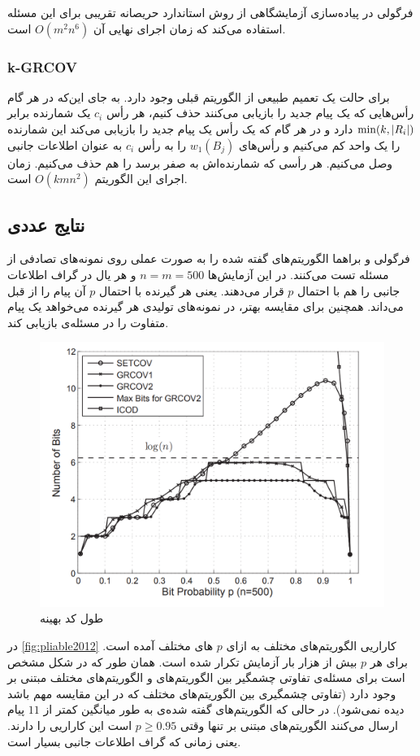 فرگولی در پیاده‌سازی آزمایشگاهی از روش استاندارد حریصانه تقریبی برای این مسئله استفاده می‌کند که زمان اجرای نهایی آن
$O(m^2 n^6)$
است.

\subsubsection{k-GRCOV}
برای حالت
\picodt
یک تعمیم طبیعی از الگوریتم قبلی وجود دارد. به جای این‌که در هر گام رأس‌هایی که یک پیام جدید را بازیابی می‌کنند حذف کنیم، هر رأس
$c_i$
یک شمارنده برابر
$\min(k, \left|{R_i}\right|)$
دارد و در هر گام که یک رأس یک پیام جدید را بازیابی می‌کند این شمارنده را یک واحد کم می‌کنیم و رأس‌های
$w_1(B_j)$
را به رأس
$c_i$
به عنوان اطلاعات جانبی وصل می‌کنیم. هر رأسی که شمارنده‌اش به صفر برسد را هم حذف می‌کنیم. زمان اجرای این الگوریتم
$O(kmn^2)$
است.

\subsection{
    نتایج عددی
}
فرگولی و براهما الگوریتم‌های گفته شده را به صورت عملی روی نمونه‌های تصادفی از مسئله تست می‌کنند. در این آزمایش‌ها
$n = m = 500$
و هر یال در گراف اطلاعات جانبی را هم با احتمال
$p$
قرار می‌دهند. یعنی هر گیرنده با احتمال
$p$
آن پیام را از قبل می‌داند. همچنین برای مقایسه بهتر، در نمونه‌های تولیدی هر گیرنده می‌خواهد یک پیام متفاوت را در مسئله‌ی
\icod
بازیابی کند.
\begin{figure}
    \centering
    \includegraphics[width=0.7\linewidth]{figs/ch3/pliable2012}
    \caption[
        طول کد بهینه
    ]{طول کد بهینه\cite{pliablefirstpaper}}
    \label{fig:pliable2012}
\end{figure}

در
\autoref{fig:pliable2012}
کاراریی الگوریتم‌های مختلف به ازای
$p$
های مختلف آمده است. برای هر
$p$
بیش از هزار بار آزمایش تکرار شده است. همان طور که در شکل مشخص است برای مسئله‌ی \picod تفاوتی چشمگیر بین الگوریتم‌های
\picod
و الگوریتم‌های مختلف مبتنی بر
\icod
وجود دارد (تفاوتی چشمگیری بین الگوریتم‌های مختلف
\icod
که در این مقایسه مهم باشد دیده نمی‌شود). در حالی که الگوریتم‌های گفته شده‌ی
\picod
به طور میانگین کمتر از
$11$
پیام ارسال می‌کنند الگوریتم‌های مبتنی بر
\icod
تنها وقتی
$p \geq 0.95$
است این کاراریی را دارند. یعنی زمانی که گراف اطلاعات جانبی بسیار  است.

